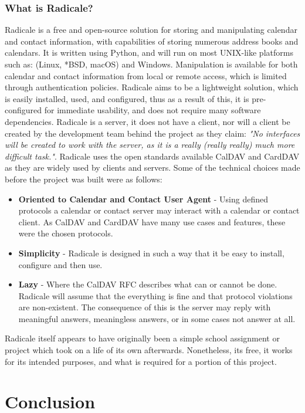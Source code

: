 \subsubsection{What is Radicale?}
	Radicale is a free and open-source solution for storing and manipulating calendar and contact information, with capabilities of storing numerous address books and calendars. It is written using Python, and will run on most UNIX-like platforms such as: (Linux, *BSD, macOS) and Windows. Manipulation is available for both calendar and contact information from local or remote access, which is limited through authentication policies. Radicale aims to be a lightweight solution, which is easily installed, used, and configured, thus as a result of this, it is pre-configured for immediate usability, and does not require many software dependencies\cite{kozea}. Radicale is a server, it does not have a client, nor will a client be created by the development team behind the project as they claim: \emph{"No interfaces will be created to work with the server, as it is a really (really really) much more difficult task."}\cite{kozea}. Radicale uses the open standards available CalDAV and CardDAV as they are widely used by clients and servers. Some of the technical choices made before the project was built were as follows:
    \begin{itemize}
    \item \textbf{Oriented to Calendar and Contact User Agent} - Using defined protocols a calendar or contact server may interact with a calendar or contact client. As CalDAV and CardDAV have many use cases and features, these were the chosen protocols.
    \item \textbf{Simplicity} - Radicale is designed in such a way that it be easy to install, configure and then use. 
    \item \textbf{Lazy} - Where the CalDAV RFC describes what can or cannot be done. Radicale will assume that the everything is fine and that protocol violations are non-existent. The consequence of this is the server may reply with meaningful answers, meaningless answers, or in some cases not answer at all.
    \end{itemize}
Radicale itself appears to have originally been a simple school assignment or project which took on a life of its own afterwards.\cite{kozea} Nonetheless, its free, it works for its intended purposes, and what is required for a portion of this project.



\section{Conclusion}
